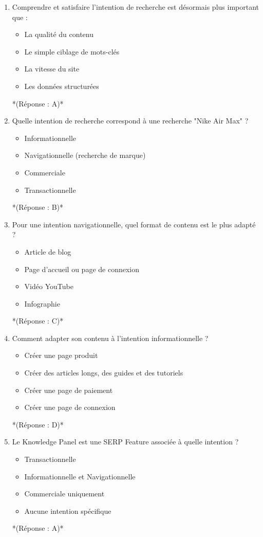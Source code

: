 \documentclass[12pt,a4paper,twoside]{report}
\begin{document}
\begin{enumerate}
\item Comprendre et satisfaire l'intention de recherche est désormais plus important que :
\begin{itemize}
\item[A)] La qualité du contenu
\item[B)] Le simple ciblage de mots-clés
\item[C)] La vitesse du site
\item[D)] Les données structurées
\end{itemize}
*(Réponse : A)*

\item Quelle intention de recherche correspond à une recherche "Nike Air Max" ?
\begin{itemize}
\item[A)] Informationnelle
\item[B)] Navigationnelle (recherche de marque)
\item[C)] Commerciale
\item[D)] Transactionnelle
\end{itemize}
*(Réponse : B)*

\item Pour une intention navigationnelle, quel format de contenu est le plus adapté ?
\begin{itemize}
\item[A)] Article de blog
\item[B)] Page d'accueil ou page de connexion
\item[C)] Vidéo YouTube
\item[D)] Infographie
\end{itemize}
*(Réponse : C)*

\item Comment adapter son contenu à l'intention informationnelle ?
\begin{itemize}
\item[A)] Créer une page produit
\item[B)] Créer des articles longs, des guides et des tutoriels
\item[C)] Créer une page de paiement
\item[D)] Créer une page de connexion
\end{itemize}
*(Réponse : D)*

\item Le Knowledge Panel est une SERP Feature associée à quelle intention ?
\begin{itemize}
\item[A)] Transactionnelle
\item[B)] Informationnelle et Navigationnelle
\item[C)] Commerciale uniquement
\item[D)] Aucune intention spécifique
\end{itemize}
*(Réponse : A)*


\end{enumerate}
\end{document}

